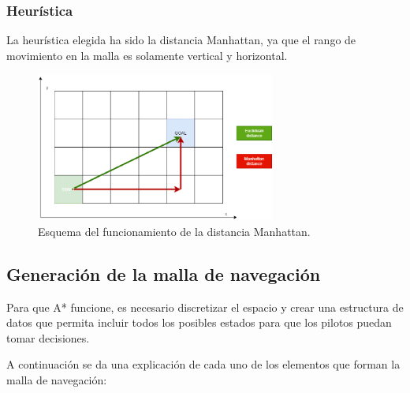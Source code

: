 \subsubsection{Heurística}




La heurística elegida ha sido la distancia Manhattan, ya que el rango de movimiento en la malla es solamente vertical y horizontal.

\begin{figure}[H]
    \centering
    \includegraphics[width=0.7\textwidth]{imagenes/Euclidean-and-Manhattan-distance-comparison-3235-Optimizations-The-first-optimization.png}
    \caption{Esquema del funcionamiento de la distancia Manhattan\cite{gameai}.}
    \label{fig:manhattan}
\end{figure}


\subsection{Generación de la malla de navegación}
Para que A* funcione, es necesario discretizar el espacio y crear una estructura de datos que permita incluir todos los posibles estados para que los pilotos puedan tomar decisiones.

\bigskip

A continuación se da una explicación de cada uno de los elementos que forman la malla de navegación:

